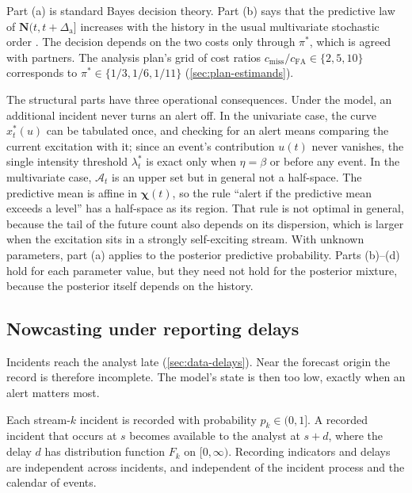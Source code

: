 Part (a) is standard Bayes decision theory. Part (b) says that the predictive law of
$\bm N(t,t+\Delta_{\mathrm a}]$ increases with the history in the usual multivariate stochastic
order \citep{shaked2007}. The decision depends on the two costs only
through $\pi^*$, which is agreed with partners. The analysis plan's grid of cost ratios
$c_{\mathrm{miss}}/c_{\mathrm{FA}}\in\{2,5,10\}$ corresponds to
$\pi^*\in\{1/3,1/6,1/11\}$ (\cref{sec:plan-estimands}).

The structural parts have three operational consequences. Under the model, an
additional incident never turns an alert off. In the univariate case, the curve
$x^*_t(u)$ can be tabulated once, and checking for an alert means comparing the current
excitation with it; since an event's contribution $u(t)$ never vanishes, the single
intensity threshold $\lambda^*_t$ is exact only when $\eta=\beta$ or before any event. In
the multivariate case, $\mathcal A_t$ is an upper set but in general not a half-space. The
predictive mean is affine in $\bm\chi(t)$, so the rule ``alert if the predictive mean
exceeds a level'' has a half-space as its region. That rule is not optimal in general,
because the tail of the future count also depends on its dispersion, which is larger when
the excitation sits in a strongly self-exciting stream.
With unknown parameters, part (a) applies to the posterior predictive probability.
Parts (b)--(d) hold for each parameter value, but they need not hold for the posterior
mixture, because the posterior itself depends on the history.

\subsection{Nowcasting under reporting delays}\label{sec:fc-nowcast}

Incidents reach the analyst late (\cref{sec:data-delays}). Near the forecast origin the
record is therefore incomplete. The model's state is then too low, exactly when an alert
matters most.

\begin{assumption}\label{ass:fc-report}
Each stream-$k$ incident is recorded with probability $p_k\in(0,1]$. A recorded incident
that occurs at $s$ becomes available to the analyst at $s+d$, where the delay $d$ has distribution
function $F_k$ on $[0,\infty)$. Recording indicators and delays are independent across
incidents, and independent of the incident process and the calendar of events.
\end{assumption}

